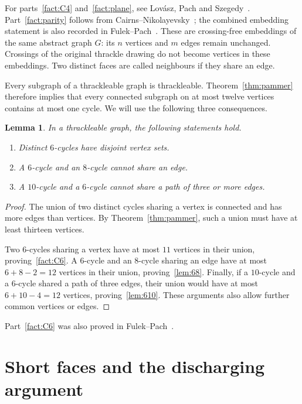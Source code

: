 \documentclass[11pt,a4paper]{article}
\newtheorem{lemma}[theorem]{Lemma}
\begin{document}
For parts~\ref{fact:C4} and~\ref{fact:plane}, see Lov\'asz, Pach and
Szegedy~\cite[Lemma~2.1 and Theorem~1.4]{LPS1997}.
Part~\ref{fact:parity} follows from
Cairns--Nikolayevsky~\cite[Theorem~2]{CN2009}; the combined embedding
statement is also recorded in Fulek--Pach~\cite[Corollary~1]{FP2019}.
These are crossing-free embeddings of the same abstract graph $G$:
its $n$ vertices and $m$ edges remain unchanged. Crossings of the
original thrackle drawing do not become vertices in these embeddings.
Two distinct faces are called neighbours if they share an edge.

Every subgraph of a thrackleable graph is thrackleable.
Theorem~\ref{thm:pammer} therefore implies that every connected subgraph
on at most twelve vertices contains at most one cycle. We will use the
following three consequences.

\begin{lemma}\label{lem:intersections}
In a thrackleable graph, the following statements hold.
\begin{enumerate}[label=\textup{(\roman*)}]
\item\label{fact:C6} Distinct $6$-cycles have disjoint vertex sets.
\item\label{lem:68} A $6$-cycle and an $8$-cycle cannot share an edge.
\item\label{lem:610} A $10$-cycle and a $6$-cycle cannot share a path
of three or more edges.
\end{enumerate}
\end{lemma}

\begin{proof}
The union of two distinct cycles sharing a vertex is connected and has
more edges than vertices. By Theorem~\ref{thm:pammer}, such a union
must have at least thirteen vertices.

Two $6$-cycles sharing a vertex have at most $11$ vertices in their
union, proving~\ref{fact:C6}. A $6$-cycle and an $8$-cycle sharing
an edge have at most $6+8-2=12$ vertices in their union,
proving~\ref{lem:68}. Finally, if a $10$-cycle and a $6$-cycle shared
a path of three edges, their union would have at most $6+10-4=12$
vertices, proving~\ref{lem:610}. These arguments also allow further
common vertices or edges.
\end{proof}

Part~\ref{fact:C6} was also proved in Fulek--Pach~\cite{FP2011}.

\section{Short faces and the discharging argument}\label{sec:discharging}
\end{document}
